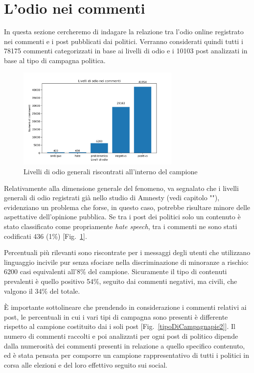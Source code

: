 \section{L'odio nei commenti}
In questa sezione cercheremo di indagare la relazione tra l'odio online registrato nei commenti e i post pubblicati dai politici. Verranno considerati quindi tutti i 78175 commenti categorizzati in base ai livelli di odio e i 10103 post analizzati in base al tipo di campagna politica.
\begin{figure}
	\includegraphics[width=8cm]{figures/odio}
	\caption{Livelli di odio generali riscontrati all'interno del campione}
	\label{odio3}
\end{figure}

Relativamente alla dimensione generale del fenomeno, va segnalato che i livelli generali di odio registrati già nello studio di Amnesty (vedi capitolo ""), evidenziano un problema che forse, in questo caso, potrebbe risultare minore delle aspettative dell’opinione pubblica. Se tra i post dei politici solo un contenuto è stato classificato come propriamente \textit{hate speech}, tra i commenti ne sono stati codificati 436 (1\%) [Fig.~\ref{odio3}].

Percentuali più rilevanti sono riscontrate per i messaggi degli utenti che utilizzano linguaggio incivile pur senza sfociare nella discriminazione di minoranze a rischio: 6200 casi equivalenti all'8\% del campione. Sicuramente il tipo di contenuti prevalenti è quello positivo 54\%, seguito dai commenti negativi, ma civili, che valgono il 34\% del totale.

È importante sottolineare che prendendo in considerazione i commenti relativi ai post, le percentuali in cui i vari tipi di campagna sono presenti è differente rispetto al campione costituito dai i soli post [Fig.~\ref{tipoDiCampagnapie2}]. Il numero di commenti raccolti e poi analizzati per ogni post di politico dipende dalla numerosità dei commenti presenti in relazione a quello specifico contenuto, ed è stata pensata per comporre un campione rappresentativo di tutti i politici in corsa alle elezioni e del loro effettivo seguito sui social.

